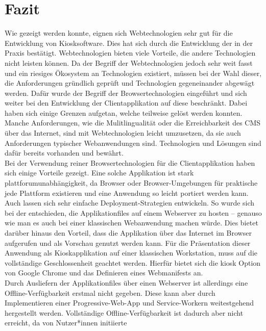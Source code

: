\chapter{Fazit}
\label{chap:fazit}

Wie gezeigt werden konnte, eignen sich Webtechnologien sehr gut für
die Entwicklung von Kiosksoftware. Dies hat sich durch die Entwicklung
der \shst{} in der Praxis bestätigt. Webtechnologien bieten viele Vorteile, die andere
Technologien nicht leisten können. Da der Begriff der Webtechnologien jedoch
sehr weit fasst und ein riesiges Ökosystem an Technologien existiert, müssen bei
der Wahl dieser, die Anforderungen gründlich geprüft und Technologien gegeneinander 
abgewägt werden. Dafür wurde der Begriff der Browsertechnologien eingeführt und sich
weiter bei den Entwicklung der Clientapplikation auf diese beschränkt. 
Dabei haben sich einige Grenzen aufgetan, welche teilweise gelöst werden konnten.\\
Manche Anforderungen, wie die Mulitlingualität oder die Erreichbarkeit des CMS über das Internet,
sind mit Webtechnologien leicht umzusetzen, da sie auch Anforderungen typischer Webanwendungen sind.
Technologien und Lösungen sind dafür bereits vorhanden und bewährt.\\
Bei der Verwendung reiner Browsertechnologien für die Clientapplikation haben sich einige Vorteile 
gezeigt. Eine solche Applikation ist stark plattforumunabhängigkeit, da Browser oder Browser-Umgebungen
für praktische jede Plattform existieren und eine Anwendung so leicht portiert werden kann. Auch lassen
sich sehr einfache Deployment-Strategien entwickeln. So wurde sich bei der \shst{} entschieden, die
Applikationfiles auf einem Webserver zu hosten -- genauso wie man es auch bei einer klassischen %
Webanwendung machen würde. Dies bietet darüber hinaus den Vorteil, dass die Applikation über das Internet
im Browser aufgerufen und als Vorschau genutzt werden kann. Für die Präsentation dieser Anwendung als
Kioskapplikation auf einer klassischen Workstation, muss auf die vollständige Geschlossenheit geachtet werden.
Hierfür bietet sich die kiosk Option von Google Chrome und das Definieren eines Webmanifests an.\\
Durch Ausliefern der Applikationfiles über einen Webserver ist allerdings eine Offline-Verfügbarkeit
erstmal nicht gegeben. Diese kann aber durch Implementieren einer Progressive-Web-App und 
Service-Workern weitestgehend hergestellt werden.
Vollständige Offline-Verfügbarkeit ist dadurch aber nicht erreicht, da von Nutzer*innen initiierte
